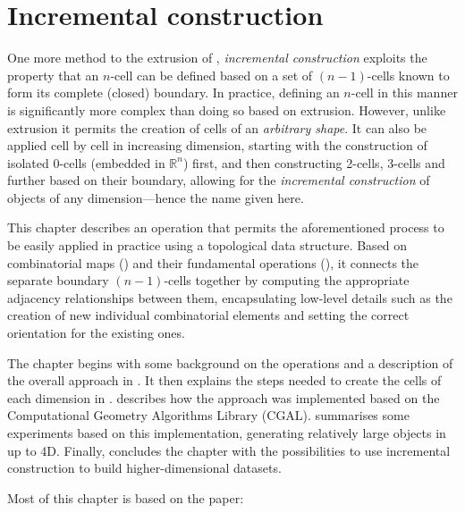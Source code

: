 
\chapter{Incremental construction}
\label{ch:incremental-construction}

One more method to the extrusion of , \emph{incremental construction} exploits the property that an $n$-cell can be defined based on a set of $(n-1)$-cells known to form its complete (closed) boundary.
In practice, defining an $n$-cell in this manner is significantly more complex than doing so based on extrusion.
However, unlike extrusion it permits the creation of cells of an \emph{arbitrary shape}.
It can also be applied cell by cell in increasing dimension, starting with the construction of isolated 0-cells (embedded in $\mathbb{R}^n$) first, and then constructing 2-cells, 3-cells and further based on their boundary, allowing for the \emph{incremental construction} of objects of any dimension---hence the name given here.

This chapter describes an operation that permits the aforementioned process to be easily applied in practice using a topological data structure.
Based on combinatorial maps () and their fundamental operations (), it connects the separate boundary $(n-1)$-cells together by computing the appropriate adjacency relationships between them, encapsulating low-level details such as the creation of new individual combinatorial elements and setting the correct orientation for the existing ones.

The chapter begins with some background on the operations and a description of the overall approach in .
It then explains the steps needed to create the cells of each dimension in .
 describes how the approach was implemented based on the Computational Geometry Algorithms Library (CGAL).
 summarises some experiments based on this implementation, generating relatively large objects in up to 4D.
Finally,  concludes the chapter with the possibilities to use incremental construction to build higher-dimensional datasets.

Most of this chapter is based on the paper:
\begin{itemize}
\papericaaincrementalconstruction%
\end{itemize}

